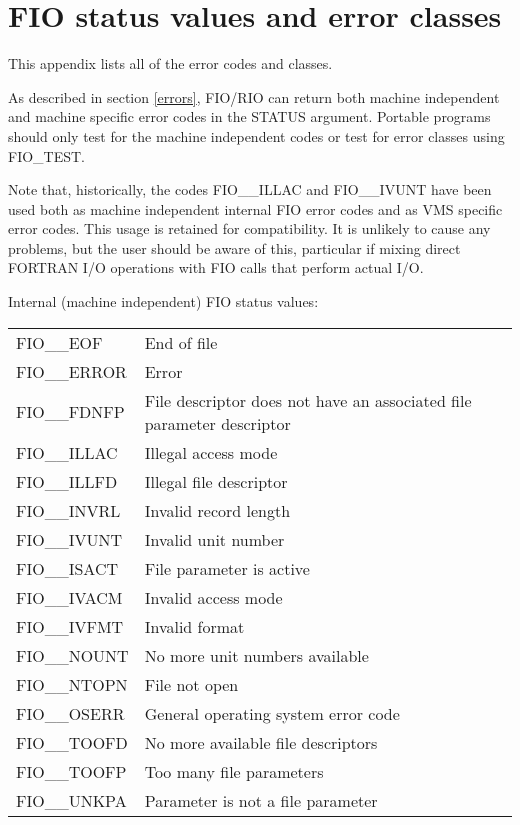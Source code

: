 \documentclass[twoside,11pt,nolof]{starlink}
\begin{document}
\section{FIO status values and error classes}
\label{status-values}

This appendix lists all of the error codes and classes.

As described in section \ref{errors}, FIO/RIO can return both machine
independent and machine specific error codes in the STATUS argument. Portable
programs should only test for the machine independent codes or test for error
classes using FIO\_TEST.

Note that, historically, the codes FIO\_\_ILLAC and FIO\_\_IVUNT have been used
both as machine independent internal FIO error codes and as VMS specific error
codes. This usage is retained for compatibility. It is unlikely to cause any
problems, but the user should be aware of this, particular if mixing direct
FORTRAN I/O operations with FIO calls that perform actual I/O.

Internal (machine independent) FIO status values:

\begin{tabular}{ll}
FIO\_\_EOF   & End of file \\
FIO\_\_ERROR & Error \\
FIO\_\_FDNFP & File descriptor does not have an associated file parameter
descriptor \\
FIO\_\_ILLAC \footnotemark[1] & Illegal access mode \\
FIO\_\_ILLFD & Illegal file descriptor \\
FIO\_\_INVRL & Invalid record length \\
FIO\_\_IVUNT \footnotemark[1] & Invalid unit number \\
FIO\_\_ISACT & File parameter is active \\
FIO\_\_IVACM & Invalid access mode \\
FIO\_\_IVFMT & Invalid format \\
FIO\_\_NOUNT & No more unit numbers available \\
FIO\_\_NTOPN & File not open \\
FIO\_\_OSERR & General operating system error code \\
FIO\_\_TOOFD & No more available file descriptors \\
FIO\_\_TOOFP & Too many file parameters \\
FIO\_\_UNKPA & Parameter is not a file parameter \\
\end{tabular}
\end{document}
